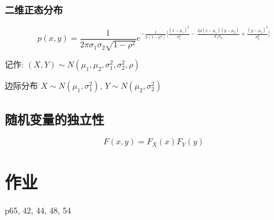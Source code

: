 \documentclass[10pt, a4paper]{article}
\begin{document}
        \subsubsection{二维正态分布}
            $$
                p(x, y) = \frac{1}{2\pi\sigma_1\sigma_2\sqrt{1 - \rho^2}}e^{-\frac{1}{2(1 - \rho^2)}\lbrack\frac{(x - \mu_1)^2}{\sigma_1^2} - \frac{2\rho(x - \mu_1)(y - \mu_2)}{\sigma_1\sigma_2} + \frac{(y - \mu_2)^2}{\sigma_2^2}\rbrack}
            $$

            记作: $(X, Y) \sim N(\mu_1, \mu_2, \sigma_1^2, \sigma_2^2, \rho)$

            边际分布 $X \sim N(\mu_1, \sigma_1^2)$, $Y \sim N(\mu_2, \sigma_2^2)$
        \subsection{随机变量的独立性}
            $$F(x, y) = F_X(x)F_Y(y)$$
            \newpage 
\section{作业}
p65, 42, 44, 48, 54
        
\end{document}
